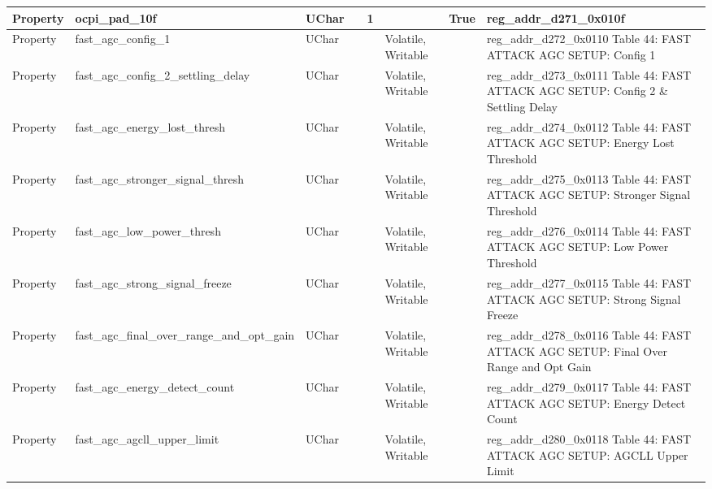 \documentclass{article}
\begin{document}
\begin{scriptsize}
\begin{longtable}{|p{2cm}|p{5cm}|p{1cm}|p{2cm}|p{2cm}|p{1.75cm}|p{1.5cm}|p{5.1cm}|}
  \hline
  Property & ocpi\_pad\_10f                                           & UChar &                  & 1                &                     & True    & reg\_addr\_d271\_0x010f \\
  \hline
  Property & fast\_agc\_config\_1                                     & UChar &                  &                  & Volatile,  Writable &         & reg\_addr\_d272\_0x0110 Table 44: FAST ATTACK AGC SETUP: Config 1 \\
  \hline
  Property & fast\_agc\_config\_2\_settling\_delay                    & UChar &                  &                  & Volatile,  Writable &         & reg\_addr\_d273\_0x0111 Table 44: FAST ATTACK AGC SETUP: Config 2 \& Settling Delay \\
  \hline
  Property & fast\_agc\_energy\_lost\_thresh                          & UChar &                  &                  & Volatile,  Writable &         & reg\_addr\_d274\_0x0112 Table 44: FAST ATTACK AGC SETUP: Energy Lost Threshold \\
  \hline
  Property & fast\_agc\_stronger\_signal\_thresh                      & UChar &                  &                  & Volatile,  Writable &         & reg\_addr\_d275\_0x0113 Table 44: FAST ATTACK AGC SETUP: Stronger Signal Threshold \\
  \hline
  Property & fast\_agc\_low\_power\_thresh                            & UChar &                  &                  & Volatile,  Writable &         & reg\_addr\_d276\_0x0114 Table 44: FAST ATTACK AGC SETUP: Low Power Threshold \\
  \hline
  Property & fast\_agc\_strong\_signal\_freeze                        & UChar &                  &                  & Volatile,  Writable &         & reg\_addr\_d277\_0x0115 Table 44: FAST ATTACK AGC SETUP: Strong Signal Freeze \\
  \hline
  Property & fast\_agc\_final\_over\_range\_and\_opt\_gain            & UChar &                  &                  & Volatile,  Writable &         & reg\_addr\_d278\_0x0116 Table 44: FAST ATTACK AGC SETUP: Final Over Range and Opt Gain \\
  \hline
  Property & fast\_agc\_energy\_detect\_count                         & UChar &                  &                  & Volatile,  Writable &         & reg\_addr\_d279\_0x0117 Table 44: FAST ATTACK AGC SETUP: Energy Detect Count \\
  \hline
  Property & fast\_agc\_agcll\_upper\_limit                           & UChar &                  &                  & Volatile,  Writable &         & reg\_addr\_d280\_0x0118 Table 44: FAST ATTACK AGC SETUP: AGCLL Upper Limit \\

\end{longtable}
\end{scriptsize}
\end{document}
